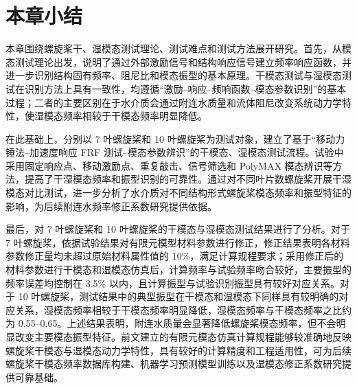 \section{本章小结}

本章围绕螺旋桨干、湿模态测试理论、测试难点和测试方法展开研究。首先，从模态测试理论出发，说明了通过外部激励信号和结构响应信号建立频率响应函数，并进一步识别结构固有频率、阻尼比和模态振型的基本原理。干模态测试与湿模态测试在识别方法上具有一致性，均遵循“激励--响应--频响函数--模态参数识别”的基本过程；二者的主要区别在于水介质会通过附连水质量和流体阻尼改变系统动力学特性，使湿模态频率相较于干模态频率明显降低。

在此基础上，分别以 7 叶螺旋桨和 10 叶螺旋桨为测试对象，建立了基于“移动力锤法--加速度响应 FRF 测试--模态参数辨识”的干模态、湿模态测试流程。试验中采用固定响应点、移动激励点、重复敲击、信号筛选和 PolyMAX 模态辨识等方法，提高了干湿模态频率和振型识别的可靠性。通过对不同叶片数螺旋桨开展干湿模态对比测试，进一步分析了水介质对不同结构形式螺旋桨模态频率和振型特征的影响，为后续附连水频率修正系数研究提供依据。

最后，对 7 叶螺旋桨和 10 叶螺旋桨的干模态与湿模态测试结果进行了分析。对于 7 叶螺旋桨，依据试验结果对有限元模型材料参数进行修正，修正结果表明各材料参数修正量均未超过原始材料属性值的 10\%，满足计算规程要求；采用修正后的材料参数进行干模态和湿模态仿真后，计算频率与试验频率吻合较好，主要振型的频率误差均控制在 3.5\% 以内，且计算振型与试验识别振型具有较好对应关系。对于 10 叶螺旋桨，测试结果中的典型振型在干模态和湿模态下同样具有较明确的对应关系，湿模态频率相较于干模态频率明显降低，湿模态频率与干模态频率之比约为 0.55--0.65。上述结果表明，附连水质量会显著降低螺旋桨模态频率，但不会明显改变主要模态振型特征。前文建立的有限元模态仿真计算规程能够较准确地反映螺旋桨干模态与湿模态动力学特性，具有较好的计算精度和工程适用性，可为后续螺旋桨干模态频率数据库构建、机器学习预测模型训练以及湿模态修正系数研究提供可靠基础。
